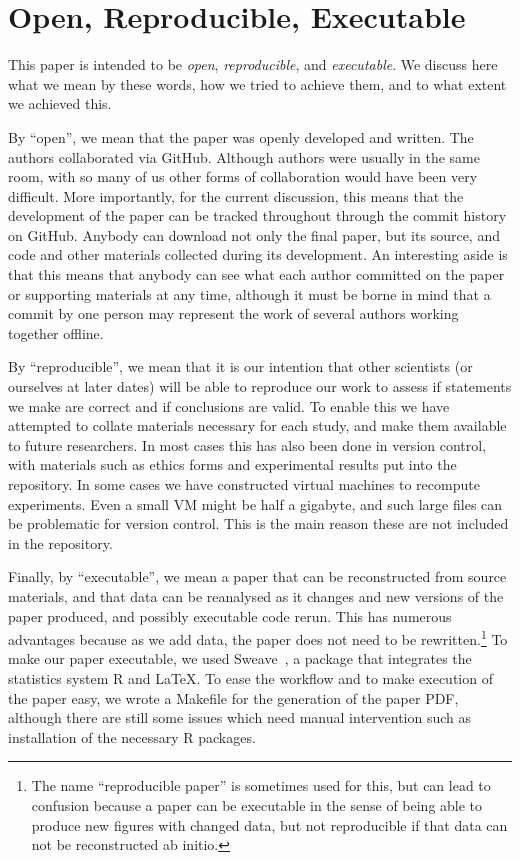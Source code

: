 \section{Open, Reproducible, Executable}

This paper is intended to be \emph{open}, 
\emph{reproducible}, and \emph{executable}.  We discuss here what we mean by these words, how we tried to achieve them, and to what extent we achieved this.

By ``open'', we mean that the paper was openly developed and written.  The authors collaborated via GitHub.
Although authors were usually in the same room, with so many of us other forms of collaboration would have been very 
difficult.  More importantly, for the current discussion, this means that the
development of the paper can be tracked throughout through the commit history on
GitHub.  Anybody can download not only the final paper, but its source, and code and other materials collected during its development.  An interesting aside is that this means that anybody can see what each author committed on the paper or supporting materials at any time, although it must be borne in mind that a commit by one person may represent the work of several authors working together offline.

By ``reproducible'', we mean that it is our intention that other scientists (or
ourselves at later dates) will be able to reproduce our work to assess if
statements we make are correct and if conclusions are valid.  To enable this we
have attempted to collate materials necessary for each study, and make them
available to future researchers.  In most cases this has also been done in
version control, 
with materials such as ethics forms and experimental results put into the repository.  In some cases we have constructed virtual machines to recompute experiments.  Even a small VM 
might be half a gigabyte, and such large files can be problematic for version
control. This is the main reason these are not included in the repository.

Finally, by ``executable'', we mean a paper that can be reconstructed from source 
materials, and that data can be reanalysed as it changes and new versions of the paper produced, and possibly executable code rerun.  
This has numerous advantages because as we add data, the paper does not need to be rewritten.\footnote{The name ``reproducible paper'' is sometimes used for this, but can lead to confusion because a paper can be executable in the sense of being able to produce new figures with 
changed data, but not reproducible if that data can not be reconstructed ab initio.}
To make our paper executable, we used Sweave~\cite{lmucs-papers:Leisch:2002}, a package that integrates the statistics system R and \LaTeX. 
To ease the workflow and to make execution of the paper easy, we wrote a Makefile for the generation of the paper PDF, although there are still some issues which need manual intervention such as installation of the necessary R packages. 


